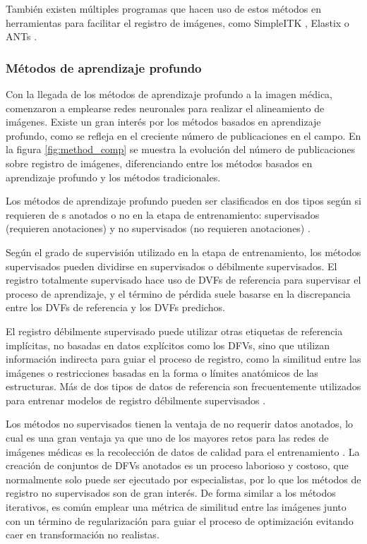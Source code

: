 También existen múltiples programas que hacen uso de estos métodos en herramientas para facilitar el registro de imágenes, como SimpleITK \cite{simpleitk}, Elastix \cite{elastix} o ANTs \cite{ants}.

\subsubsection{Métodos de aprendizaje profundo}\label{subsubsec:Métodos de aprendizaje profunda}

Con la llegada de los métodos de aprendizaje profundo a la imagen médica, comenzaron a emplearse redes neuronales para realizar el alineamiento de imágenes.
Existe un gran interés por los métodos basados en aprendizaje profundo, como se refleja en el creciente número de publicaciones en el campo. En la figura \ref{fig:method_comp} se muestra la evolución del número de publicaciones sobre registro de imágenes, diferenciando entre los métodos basados en aprendizaje profundo y los métodos tradicionales.

Los métodos de aprendizaje profundo pueden ser clasificados en dos tipos según si requieren de s anotados o no en la etapa de entrenamiento:
supervisados (requieren anotaciones) y no supervisados (no requieren anotaciones) \cite{nie2024medicalimageregistrationapplication}.

Según el grado de supervisión utilizado en la etapa de entrenamiento, los métodos supervisados pueden dividirse en supervisados o débilmente supervisados.
El registro totalmente supervisado hace uso de DVFs de referencia para supervisar el proceso de aprendizaje, y el término de pérdida suele basarse en la discrepancia entre los DVFs de referencia y los DVFs predichos.

El registro débilmente supervisado puede utilizar otras etiquetas de referencia implícitas, no basadas en datos explícitos como los DFVs, sino que utilizan información indirecta para guiar el proceso de registro, como la similitud entre las imágenes o restricciones basadas en la forma o límites anatómicos de las estructuras.
Más de dos tipos de datos de referencia son frecuentemente utilizados para entrenar modelos de registro débilmente supervisados \cite{bharati2022deeplearningmedicalimage}.

Los métodos no supervisados tienen la ventaja de no requerir datos anotados, lo cual es una gran ventaja ya que uno de los mayores retos para las redes de imágenes médicas es la recolección de datos de calidad para el entrenamiento \cite{medicalimageanalysis}.
La creación de conjuntos de DFVs anotados es un proceso laborioso y costoso, que normalmente solo puede ser ejecutado por especialistas, por lo que los métodos de registro no supervisados son de gran interés.
De forma similar a los métodos iterativos, es común emplear una métrica de similitud entre las imágenes junto con un término de regularización para guiar el proceso de optimización evitando caer en transformación no realistas.


